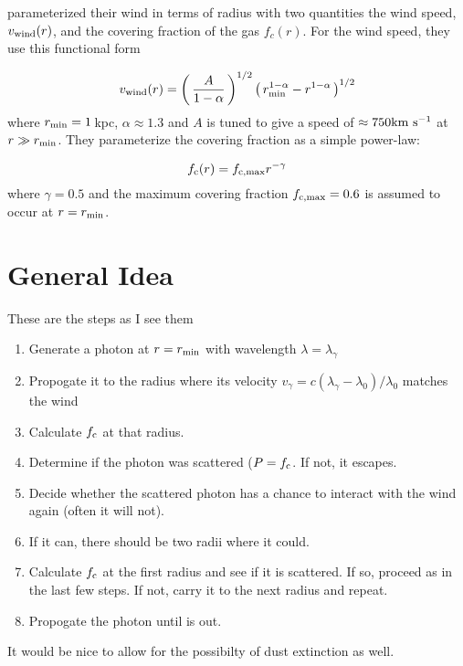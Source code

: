\documentclass[12pt,preprint]{aastex}
\begin{document}
\cite{steidel+10} parameterized their wind
in terms of radius with two quantities the wind speed, $v_{\rm wind}(r)$,
and the covering fraction of the gas $f_c(r)$.  For the wind speed,
they use this functional form

\begin{equation}
v_{\rm wind}(r) = \left ( \, \frac{A}{1-\alpha} \, \right )^{1/2} 
\left ( \, r_{\rm min}^{1-\alpha} - r^{1-\alpha} \, \right )^{1/2}
\end{equation}
where $r_{\rm min} = 1$\,kpc, $\alpha \approx 1.3$ and $A$ is tuned to
give a speed of $\approx 750{\rm km~s^{-1}}$ at $r \gg r_{\rm min}$.  They
parameterize the covering fraction as a simple power-law:

\begin{equation}
f_{\rm c}(r) =  f_{\rm c,max} r^{-\gamma}
\end{equation}
where $\gamma = 0.5$ and the maximum covering fraction $f_{\rm
  c,max}=0.6$ is assumed to occur at $r=r_{\rm min}$.

\section{General Idea}

\noindent These are the steps as I see them

\begin{enumerate}
\item Generate a photon at $r=r_{\rm min}$ with wavelength $\lambda =
  \lambda_\gamma$
\item Propogate it to the radius where its velocity $v_{\gamma} =
  c(\lambda_\gamma-\lambda_0)/\lambda_0$ matches the wind
\item Calculate $f_{\rm c}$ at that radius.
\item Determine if the photon was scattered ($P=f_{\rm c}$.  If not, it escapes.  
\item Decide whether the scattered photon has a chance to interact
  with the wind again (often it will not).
\item If it can, there should be two radii where it could.  
\item Calculate $f_{\rm c}$ at the first radius and see if it is
  scattered. If so, proceed as in the last few steps.  If not, carry
  it to the next radius and repeat.
\item Propogate the photon until is out.  
\end{enumerate}

It would be nice to allow for the possibilty of dust extinction as
well.
\end{document}

